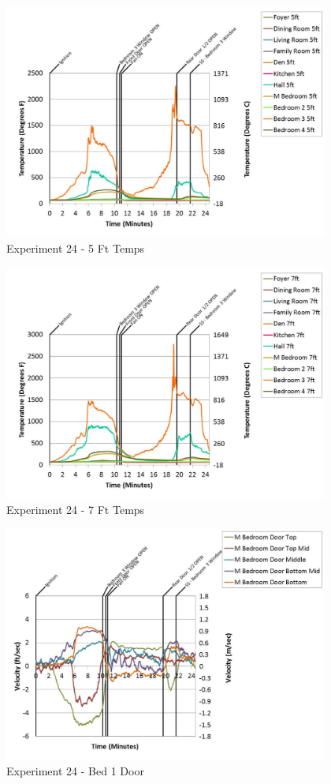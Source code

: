 \documentclass{article}
\begin{document}
\begin{appendices}
	\begin{figure}[h!]
		\centering
		\includegraphics[height=3.05in]{0_Images/Results_Charts/Exp_24_Charts/5FtTemps.pdf}
		\caption{Experiment 24 - 5 Ft Temps}
	\end{figure}
 

	\begin{figure}[h!]
		\centering
		\includegraphics[height=3.05in]{0_Images/Results_Charts/Exp_24_Charts/7FtTemps.pdf}
		\caption{Experiment 24 - 7 Ft Temps}
	\end{figure}
 
	\clearpage

	\begin{figure}[h!]
		\centering
		\includegraphics[height=3.05in]{0_Images/Results_Charts/Exp_24_Charts/Bed1Door.pdf}
		\caption{Experiment 24 - Bed 1 Door}
	\end{figure}
 


\end{appendices}
\end{document}
